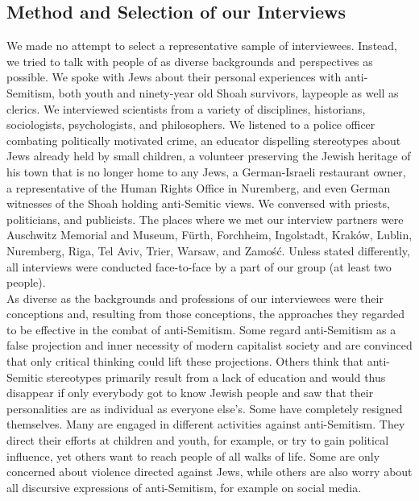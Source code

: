 \subsection*{Method and Selection of our Interviews}
We made no attempt to select a representative sample of interviewees. Instead, we tried to talk with people of as diverse backgrounds and perspectives as possible. We spoke with Jews about their personal experiences with anti-Semitism, both youth and ninety-year old Shoah survivors, laypeople as well as clerics. We interviewed scientists from a variety of disciplines, historians, sociologists, psychologists, and philosophers. We listened to a police officer combating politically motivated crime, an educator dispelling stereotypes about Jews already held by small children, a volunteer preserving the Jewish heritage of his town that is no longer home to any Jews, a German-Israeli restaurant owner, a representative of the Human Rights Office in Nuremberg, and even German witnesses of the Shoah holding anti-Semitic views. We conversed with priests, politicians, and publicists. The places where we met our interview partners were Auschwitz Memorial and Museum, Fürth, Forchheim, Ingolstadt, Kraków, Lublin, Nuremberg, Riga, Tel Aviv, Trier, Warsaw, and Zamość. Unless stated differently, all interviews were conducted face-to-face by a part of our group (at least two people).\\
As diverse as the backgrounds and professions of our interviewees were their conceptions and, resulting from those conceptions, the approaches they regarded to be effective in the combat of anti-Semitism. Some regard anti-Semitism as a false projection and inner necessity of modern capitalist society and are convinced that only critical thinking could lift these projections. Others think that anti-Semitic stereotypes primarily result from a lack of education and would thus disappear if only everybody got to know Jewish people and saw that their personalities are as individual as everyone else's. Some have completely resigned themselves. Many are engaged in different activities against anti-Semitism. They direct their efforts at children and youth, for example, or try to gain political influence, yet others want to reach people of all walks of life. Some are only concerned about violence directed against Jews, while others are also worry about all discursive expressions of anti-Semitism, for example on social media. 

